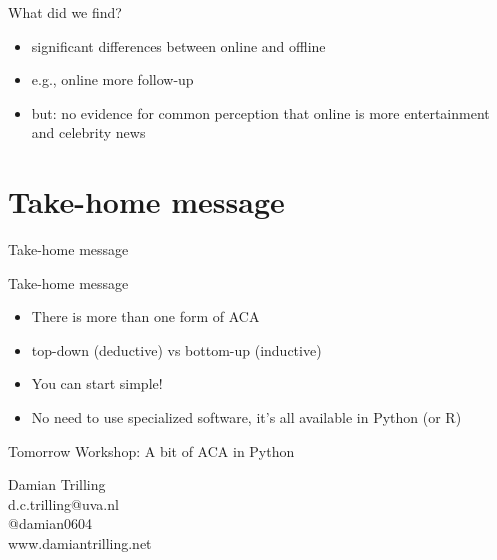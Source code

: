 \documentclass{beamer}
\begin{document}
\begin{frame}{What did we find?}
	\begin{itemize}
	\item significant differences between online and offline
	\item e.g., online more follow-up
	\item but: no evidence for common perception that online is more entertainment and celebrity news
	\end{itemize}
\end{frame}




\section{Take-home message}
\begin{frame}
	Take-home message
\end{frame}

\begin{frame}{Take-home message}
\begin{itemize}
	\item There is more than one form of ACA
	\item top-down (deductive) vs bottom-up (inductive)
	\item You can start simple!
	\item No need to use specialized software, it's all available in Python (or R)
\end{itemize}
\end{frame}


\begin{frame}{Tomorrow}
	Workshop: A bit of ACA in Python
\end{frame}

\begin{frame}[plain]
	\huge
	\centering
	Damian Trilling\\ \vspace{0.5cm}
	d.c.trilling@uva.nl\\
	@damian0604\\
	www.damiantrilling.net\\
\end{frame}
\end{document}
